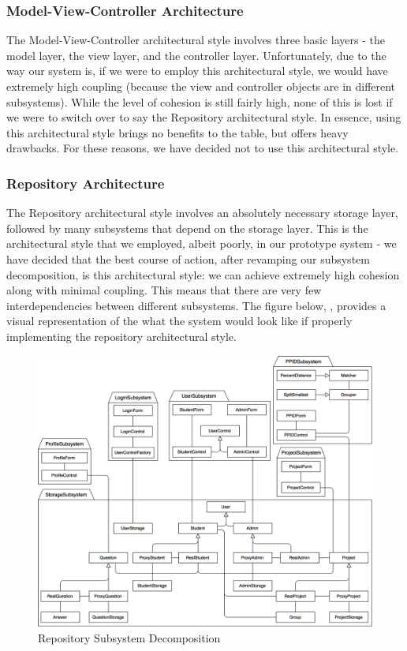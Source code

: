 \documentclass[12pt,letterpaper]{article}
\begin{document}
\subsubsection*{Model-View-Controller Architecture}

The Model-View-Controller architectural style involves three basic layers - the model layer, the view layer, and the controller layer. Unfortunately, due to the way our system is, if we were to employ this architectural style, we would have extremely high coupling (because the view and controller objects are in different subsystems). While the level of cohesion is still fairly high, none of this is lost if we were to switch over to say the Repository architectural style. In essence, using this architectural style brings no benefits to the table, but offers heavy drawbacks. For these reasons, we have decided not to use this architectural style.

\subsubsection*{Repository Architecture}

The Repository architectural style involves an absolutely necessary storage layer, followed by many subsystems that depend on the storage layer. This is the architectural style that we employed, albeit poorly, in our prototype system - we have decided that the best course of action, after revamping our subsystem decomposition, is this architectural style: we can achieve extremely high cohesion along with minimal coupling. This means that there are very few interdependencies between different subsystems. The figure below, , provides a visual representation of the what the system would look like if properly implementing the repository architectural style.

\begin{figure}[H]
	\centering{}
	\includegraphics[scale=0.25]{imgs/d3/decomp/repository.png}
	\caption{Repository Subsystem Decomposition}
\end{figure}
\end{document}
